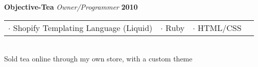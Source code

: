 \documentclass[margin,line]{res}
\begin{document}
{\begin{resume}
{\bf Objective-Tea} {\em Owner/Programmer} \hfill {\bf 2010} \
\\
\begin{tabular}{l l l l}
  $\cdot$ Shopify Templating Language (Liquid) & $\cdot$ Ruby & $\cdot$ HTML/CSS
\end{tabular}
\\
\hspace*{.14pt}
Sold tea online through my own store, with a custom theme







\end{resume}}
\end{document}
